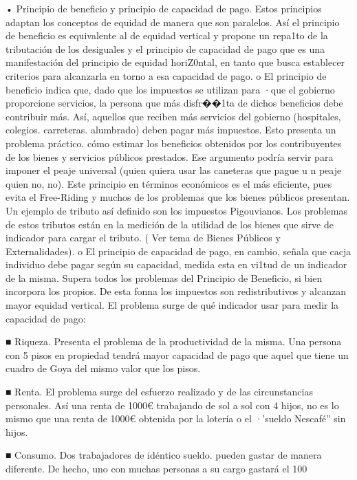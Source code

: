 \documentclass[10pt,a4paper]{article}
\begin{document}
{• Principio de beneficio y principio de capacidad de pago. Estos principios adaptan los conceptos de equidad de manera que son paralelos. Así el principio de beneficio es equivalente al de equidad vertical y propone un repa1to de la tributación de los desiguales y el principio de capacidad de pago que es una manifestación del principio de equidad horiZ0ntal, en tanto que busca establecer criterios para alcanzarla en torno a esa capacidad de pago. o El principio de beneficio indica que, dado que los impuestos se utilizan para ·que el gobierno proporcione servicios, la persona que más disfr��1ta de dichos beneficios debe contribuir más. Así, aquellos que reciben más servicios del gobierno (hospitales, colegios. carreteras. alumbrado) deben pagar más impuestos. Esto presenta un problema práctico. cómo estimar los beneficios obtenidos por los contribuyentes de los bienes y servicios públicos prestados. Ese argumento podría servir para imponer el peaje universal (quien quiera usar las caneteras que pague u n peaje quien no, no). Este principio en términos económicos es el más eficiente, pues evita el Free-Riding y muchos de los problemas que los bienes públicos presentan. Un ejemplo de tributo así definido son los impuestos Pigouvianos. Los problemas de estos tributos están en la medición de la utilidad de los bienes que sirve de indicador para cargar el tributo. ( Ver tema de Bienes Públicos y Externalidades).
o El principio de capacidad de pago, en cambio, señala que cacja individuo debe pagar según su capacidad, medida esta en vi1tud de un indicador de la misma. Supera todos los problemas del Principio de Beneficio, si bien incorpora los propios. De esta fonna los impuestos son redistributivos y alcanzan mayor equidad vertical. El problema surge de qué indicador usar para medir la capacidad de pago:

■ Riqueza. Presenta el problema de la productividad de la misma. Una persona con 5 pisos en propiedad tendrá mayor capacidad de pago que aquel que tiene un cuadro de Goya del mismo valor que los pisos.

■ Renta. El problema surge del esfuerzo realizado y de las circunstancias personales. Así una renta de 1000€ trabajando de sol a sol con 4 hijos, no es lo mismo que una renta de 1000€ obtenida por la lotería o el ·'sueldo Nescafé'' sin hijos.

■ Consumo. Dos trabajadores de idéntico sueldo. pueden gastar de manera diferente. De hecho, uno con muchas personas a su cargo gastará el 100%

}
\end{document}
